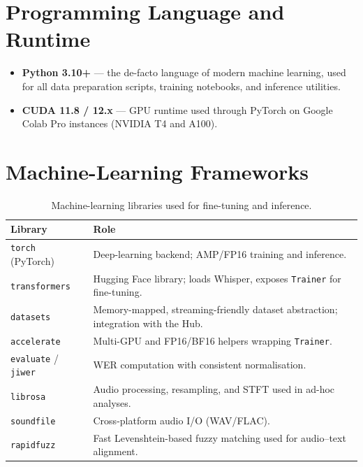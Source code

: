 \section{Programming Language and Runtime}

\begin{itemize}[leftmargin=2em]
  \item \textbf{Python 3.10+} --- the de-facto language of modern machine
        learning, used for all data preparation scripts, training
        notebooks, and inference utilities.
  \item \textbf{CUDA 11.8 / 12.x} --- GPU runtime used through PyTorch on
        Google Colab Pro instances (NVIDIA T4 and A100).
\end{itemize}

\section{Machine-Learning Frameworks}

\begin{table}[H]
  \centering
  \caption{Machine-learning libraries used for fine-tuning and inference.}
  \label{tab:mt_ml_libs}
  \renewcommand{\arraystretch}{1.3}
  \begin{tabular}{lp{9.5cm}}
    \toprule
    \textbf{Library} & \textbf{Role} \\
    \midrule
    \texttt{torch} (PyTorch)~\cite{paszke2019pytorch} & Deep-learning backend; AMP/FP16 training and inference. \\
    \texttt{transformers}~\cite{wolf2020transformers} & Hugging Face library; loads Whisper, exposes \texttt{Trainer} for fine-tuning. \\
    \texttt{datasets}~\cite{lhoest2021datasets} & Memory-mapped, streaming-friendly dataset abstraction; integration with the Hub. \\
    \texttt{accelerate} & Multi-GPU and FP16/BF16 helpers wrapping \texttt{Trainer}. \\
    \texttt{evaluate} / \texttt{jiwer} & WER computation with consistent normalisation. \\
    \texttt{librosa} & Audio processing, resampling, and STFT used in ad-hoc analyses. \\
    \texttt{soundfile} & Cross-platform audio I/O (WAV/FLAC). \\
    \texttt{rapidfuzz}~\cite{rapidfuzz} & Fast Levenshtein-based fuzzy matching used for audio--text alignment. \\
    \bottomrule
  \end{tabular}
\end{table}

